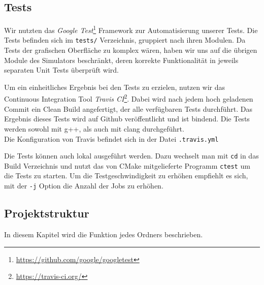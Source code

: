\subsection{Tests}

Wir nutzten das \emph{Google Test}\footnote{\url{https://github.com/google/googletest}} Framework
zur Automatisierung unserer Tests. Die Tests befinden sich im \texttt{tests/} Verzeichnis, gruppiert
nach ihren Modulen. Da Tests der grafischen Oberfläche zu komplex wären, haben wir uns auf die übrigen
Module des Simulators beschränkt, deren korrekte Funktionalität in jeweils separaten Unit Tests
überprüft wird.

Um ein einheitliches Ergebnis bei den Tests zu erzielen, nutzen wir das Continuous Integration Tool
\emph{Travis CI}\footnote{\url{https://travis-ci.org/}}. Dabei wird nach jedem hoch geladenen
Commit ein Clean Build angefertigt, der alle verfügbaren Tests durchführt. Das Ergebnis dieses Tests
wird auf Github veröffentlicht und ist bindend. Die Tests werden sowohl mit g++, als auch mit clang
durchgeführt. \\
Die Konfiguration von Travis befindet sich in der Datei \texttt{.travis.yml}

Die Tests können auch lokal ausgeführt werden. Dazu wechselt man mit \texttt{cd} in das Build
Verzeichnis und nutzt das von CMake mitgelieferte Programm \texttt{ctest} um die Tests zu starten.
Um die Testgeschwindigkeit zu erhöhen empfiehlt es sich, mit der \texttt{-j} Option die Anzahl
der Jobs zu erhöhen.

\subsection{Projektstruktur}

In diesem Kapitel wird die Funktion jedes Ordners beschrieben.

